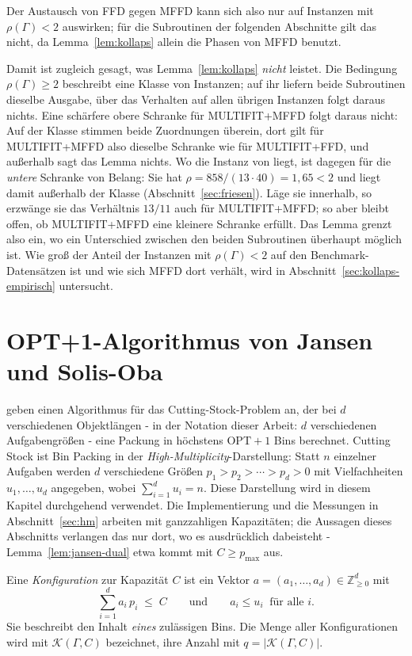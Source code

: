 Der Austausch von FFD gegen MFFD kann sich also nur auf Instanzen mit $\rho(\Gamma) < 2$
auswirken; für die Subroutinen der folgenden Abschnitte gilt das nicht, da
Lemma~\ref{lem:kollaps} allein die Phasen von MFFD benutzt.

Damit ist zugleich gesagt, was Lemma~\ref{lem:kollaps} \emph{nicht} leistet.
Die Bedingung $\rho(\Gamma) \ge 2$ beschreibt eine Klasse von Instanzen; auf ihr liefern beide
Subroutinen dieselbe Ausgabe, über das Verhalten auf allen übrigen Instanzen folgt daraus nichts.
Eine schärfere obere Schranke für MULTIFIT+MFFD folgt daraus nicht: Auf der Klasse stimmen beide
Zuordnungen überein, dort gilt für MULTIFIT+MFFD also dieselbe Schranke wie für MULTIFIT+FFD,
und außerhalb sagt das Lemma nichts.
Wo die Instanz von \textcite{friesen1984} liegt, ist dagegen für die \emph{untere} Schranke
von Belang: Sie hat $\rho = 858/(13 \cdot 40) = 1{,}65 < 2$ und liegt damit außerhalb der Klasse
(Abschnitt~\ref{sec:friesen}).
Läge sie innerhalb, so erzwänge sie das Verhältnis $13/11$ auch für MULTIFIT+MFFD; so aber bleibt
offen, ob MULTIFIT+MFFD eine kleinere Schranke erfüllt.
Das Lemma grenzt also ein, wo ein Unterschied zwischen den beiden Subroutinen überhaupt möglich
ist.
Wie groß der Anteil der Instanzen mit $\rho(\Gamma) < 2$ auf den Benchmark-Datensätzen ist und wie
sich MFFD dort verhält, wird in Abschnitt~\ref{sec:kollaps-empirisch} untersucht.


\section{OPT+1-Algorithmus von Jansen und Solis-Oba}
\label{sec:jansen}

\textcite{jansen_solisoba2010} geben einen Algorithmus für das Cutting-Stock-Problem an, der bei $d$ verschiedenen Objektlängen - in der Notation dieser Arbeit: $d$ verschiedenen
Aufgabengrößen - eine Packung in höchstens $\mathrm{OPT}+1$ Bins berechnet.
Cutting Stock ist Bin Packing in der \emph{High-Multiplicity}-Darstellung: Statt $n$ einzelner Aufgaben werden $d$ verschiedene Größen $p_1 > p_2 > \cdots > p_d > 0$ mit Vielfachheiten $u_1, \ldots, u_d$ angegeben, wobei $\sum_{i=1}^{d} u_i = n$.
Diese Darstellung wird in diesem Kapitel durchgehend verwendet.
Die Implementierung und die Messungen in Abschnitt~\ref{sec:hm} arbeiten mit ganzzahligen
Kapazitäten; die Aussagen dieses Abschnitts verlangen das nur dort, wo es ausdrücklich
dabeisteht - Lemma~\ref{lem:jansen-dual} etwa kommt mit $C \ge p_{\max}$ aus.

\begin{definition}[Konfiguration]
\label{def:konfiguration}
Eine \emph{Konfiguration} zur Kapazität $C$ ist ein Vektor $a = (a_1, \ldots, a_d) \in \mathbb{Z}_{\ge 0}^{d}$ mit
\[
  \sum_{i=1}^{d} a_i\, p_i \;\le\; C
  \qquad\text{und}\qquad
  a_i \le u_i \ \text{ für alle } i .
\]
Sie beschreibt den Inhalt \emph{eines} zulässigen Bins.
Die Menge aller Konfigurationen wird mit $\mathcal{K}(\Gamma, C)$ bezeichnet, ihre Anzahl mit $q = |\mathcal{K}(\Gamma, C)|$.
\end{definition}

